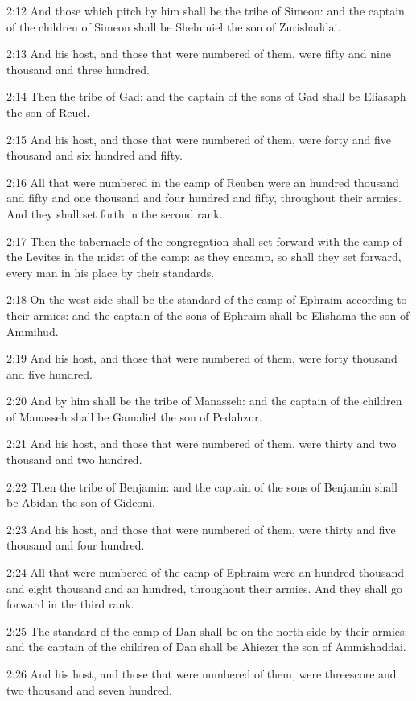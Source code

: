2:12 And those which pitch by him shall be the tribe of Simeon: and the captain of the children of Simeon shall be Shelumiel the son of Zurishaddai.

2:13 And his host, and those that were numbered of them, were fifty and nine thousand and three hundred.

2:14 Then the tribe of Gad: and the captain of the sons of Gad shall be Eliasaph the son of Reuel.

2:15 And his host, and those that were numbered of them, were forty and five thousand and six hundred and fifty.

2:16 All that were numbered in the camp of Reuben were an hundred thousand and fifty and one thousand and four hundred and fifty, throughout their armies. And they shall set forth in the second rank.

2:17 Then the tabernacle of the congregation shall set forward with the camp of the Levites in the midst of the camp: as they encamp, so shall they set forward, every man in his place by their standards.

2:18 On the west side shall be the standard of the camp of Ephraim according to their armies: and the captain of the sons of Ephraim shall be Elishama the son of Ammihud.

2:19 And his host, and those that were numbered of them, were forty thousand and five hundred.

2:20 And by him shall be the tribe of Manasseh: and the captain of the children of Manasseh shall be Gamaliel the son of Pedahzur.

2:21 And his host, and those that were numbered of them, were thirty and two thousand and two hundred.

2:22 Then the tribe of Benjamin: and the captain of the sons of Benjamin shall be Abidan the son of Gideoni.

2:23 And his host, and those that were numbered of them, were thirty and five thousand and four hundred.

2:24 All that were numbered of the camp of Ephraim were an hundred thousand and eight thousand and an hundred, throughout their armies.  And they shall go forward in the third rank.

2:25 The standard of the camp of Dan shall be on the north side by their armies: and the captain of the children of Dan shall be Ahiezer the son of Ammishaddai.

2:26 And his host, and those that were numbered of them, were threescore and two thousand and seven hundred.

